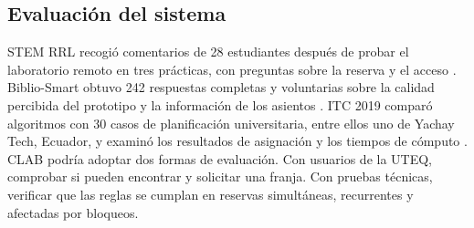 {  \subsection{Evaluación del sistema}

  STEM RRL recogió comentarios de 28 estudiantes después de probar el
  laboratorio remoto en tres prácticas, con preguntas sobre la reserva y el
  acceso \cite{gilVera2024}. Biblio-Smart obtuvo 242 respuestas completas y
  voluntarias sobre la calidad percibida del prototipo y la información de
  los asientos \cite{garciaGranja2022}. ITC 2019 comparó algoritmos con 30
  casos de planificación universitaria, entre ellos uno de Yachay Tech,
  Ecuador, y examinó los resultados de asignación y los tiempos de cómputo
  \cite{muller2025}. CLAB podría adoptar dos formas de evaluación. Con usuarios
  de la UTEQ, comprobar si pueden encontrar y solicitar una franja. Con
  pruebas técnicas, verificar que las reglas se cumplan en reservas
  simultáneas, recurrentes y afectadas por bloqueos.
}

